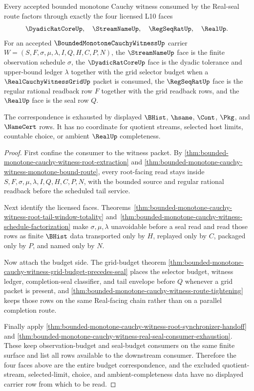 \begin{theorem}
\label{thm:bounded-monotone-cauchy-witness-four-face-budget-correspondence}
Every accepted bounded monotone Cauchy witness consumed by the Real-seal route factors through exactly the four licensed L10 faces
$$
\DyadicRatCoreUp,\quad \StreamNameUp,\quad \RegSeqRatUp,\quad \RealUp.
$$
For an accepted $\BoundedMonotoneCauchyWitnessUp$ carrier $W=(S,F,\sigma,\mu,\lambda,I,Q,H,C,P,N)$, the $\StreamNameUp$ face is the finite observation schedule $\sigma$, the $\DyadicRatCoreUp$ face is the dyadic tolerance and upper-bound ledger $\lambda$ together with the grid selector budget when a $\RealCauchyWitnessGridUp$ packet is consumed, the $\RegSeqRatUp$ face is the regular rational readback row $F$ together with the grid readback rows, and the $\RealUp$ face is the seal row $Q$.

The correspondence is exhausted by displayed $\BHist$, $\hsame$, $\Cont$, $\Pkg$, and $\NameCert$ rows. It has no coordinate for quotient streams, selected host limits, countable choice, or ambient $\RealUp$ completeness.
\end{theorem}
\begin{proof}
First confine the consumer to the witness packet. By \autoref{thm:bounded-monotone-cauchy-witness-root-extraction} and \autoref{thm:bounded-monotone-cauchy-witness-monotone-bound-route}, every root-facing read stays inside $S,F,\sigma,\mu,\lambda,I,Q,H,C,P,N$, with the bounded source and regular rational readback before the scheduled tail service.

Next identify the licensed faces. Theorems~\ref{thm:bounded-monotone-cauchy-witness-root-tail-window-totality} and~\ref{thm:bounded-monotone-cauchy-witness-schedule-factorization} make $\sigma,\mu,\lambda$ unavoidable before a seal read and read those rows as finite $\BHist$ data transported only by $H$, replayed only by $C$, packaged only by $P$, and named only by $N$.

Now attach the budget side. The grid-budget theorem \autoref{thm:bounded-monotone-cauchy-witness-grid-budget-precedes-seal} places the selector budget, witness ledger, completion-seal classifier, and tail envelope before $Q$ whenever a grid packet is present, and \autoref{thm:bounded-monotone-cauchy-witness-route-tightening} keeps those rows on the same Real-facing chain rather than on a parallel completion route.

Finally apply \autoref{thm:bounded-monotone-cauchy-witness-root-synchronizer-handoff} and \autoref{thm:bounded-monotone-cauchy-witness-real-seal-consumer-exhaustion}. These keep observation-budget and seal-budget consumers on the same finite surface and list all rows available to the downstream consumer. Therefore the four faces above are the entire budget correspondence, and the excluded quotient-stream, selected-limit, choice, and ambient-completeness data have no displayed carrier row from which to be read.
\end{proof}

